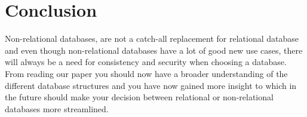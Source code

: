 \section{Conclusion}
Non-relational databases, are not a catch-all replacement for relational database and even though non-relational databases have a lot of good new use cases, there will always be a need for consistency and security when choosing a database. 
From reading our paper you should now have a broader understanding of the different database structures and you have now gained more insight to which in the future should make your decision between relational or non-relational databases more streamlined.